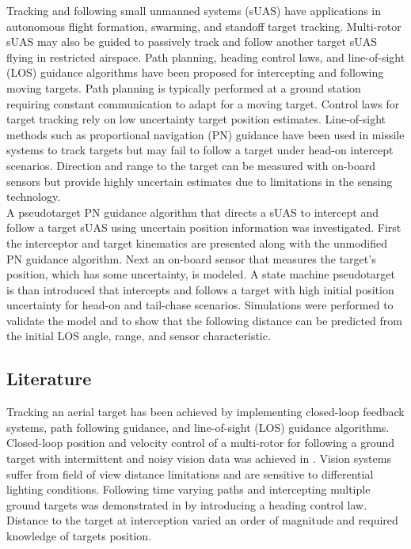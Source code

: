 \documentclass[conference]{IEEEtran}
\begin{document}
Tracking and following small unmanned systems (sUAS) have applications in autonomous flight formation, swarming, and standoff target tracking. Multi-rotor sUAS may also be guided to passively track and follow another target sUAS flying in restricted airspace. Path planning, heading control laws, and line-of-sight (LOS) guidance algorithms have been proposed for intercepting and following moving targets. Path planning is typically performed at a ground station requiring constant communication to adapt for a moving target. Control laws for target tracking rely on low uncertainty target position estimates. Line-of-sight methods such as proportional navigation (PN) guidance have been used in missile systems to track targets but may fail to follow a target under head-on intercept scenarios. Direction and range to the target can be measured with on-board sensors but provide highly uncertain estimates due to limitations in the sensing technology. \\

A pseudotarget PN guidance algorithm that directs a sUAS to intercept and follow a target sUAS using uncertain position information was investigated. First the interceptor and target kinematics are presented along with the unmodified PN guidance algorithm. Next an on-board sensor that measures the target's position, which has some uncertainty, is modeled. A state machine pseudotarget is than introduced that intercepts and follows a target with high initial position uncertainty for head-on and tail-chase scenarios. Simulations were performed to validate the model and to show that the following distance can be predicted from the initial LOS angle, range, and sensor characteristic.



\subsection{Literature}
Tracking an aerial target has been achieved by implementing closed-loop feedback systems, path following guidance, and line-of-sight (LOS) guidance algorithms. Closed-loop position and velocity control of a multi-rotor for following a ground target with intermittent and noisy vision data was achieved in \cite{teuliere_chasing_2011}. Vision systems suffer from field of view distance limitations and are sensitive to differential lighting conditions. Following time varying paths and intercepting multiple ground targets was demonstrated in \cite{oliveira_moving_2016} by introducing a heading control law. Distance to the target at interception varied an order of magnitude and required knowledge of targets position. 
\end{document}
